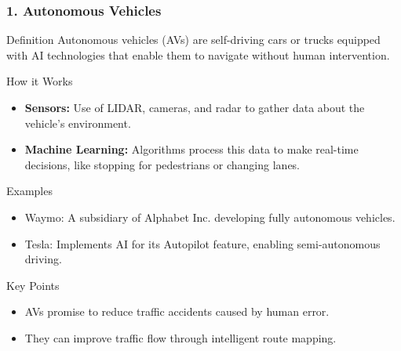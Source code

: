 \documentclass[aspectratio=169]{beamer}
\begin{document}
\begin{frame}[fragile]
    \frametitle{1. Autonomous Vehicles}
    \begin{block}{Definition}
        Autonomous vehicles (AVs) are self-driving cars or trucks equipped with AI technologies that enable them to navigate without human intervention.
    \end{block}
    
    \begin{block}{How it Works}
        \begin{itemize}
            \item \textbf{Sensors:} Use of LIDAR, cameras, and radar to gather data about the vehicle's environment.
            \item \textbf{Machine Learning:} Algorithms process this data to make real-time decisions, like stopping for pedestrians or changing lanes.
        \end{itemize}
    \end{block}

    \begin{block}{Examples}
        \begin{itemize}
            \item Waymo: A subsidiary of Alphabet Inc. developing fully autonomous vehicles.
            \item Tesla: Implements AI for its Autopilot feature, enabling semi-autonomous driving.
        \end{itemize}
    \end{block}

    \begin{block}{Key Points}
        \begin{itemize}
            \item AVs promise to reduce traffic accidents caused by human error.
            \item They can improve traffic flow through intelligent route mapping.
        \end{itemize}
    \end{block}
\end{frame}
\end{document}
